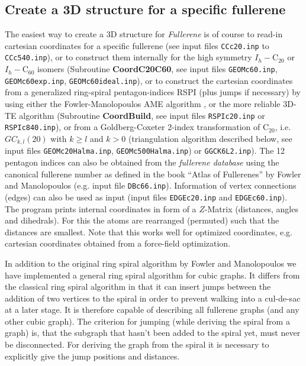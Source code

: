 \documentclass[article,a4paper,twoside]{memoir}
\newcommand{\C}[1]{\ensuremath{\mathrm{C}_{#1}}}
\newcommand{\program}[1]{\textit{#1}}
\newcommand{\filename}[1]{\texttt{#1}}
\newcommand{\funname}[1]{{\color{blue}\textbf{#1}}}
\begin{document}

\subsection{Create a 3D structure for a specific fullerene}

The easiest way to create a 3D structure for \program{Fullerene} is of course to read-in cartesian coordinates for a specific
fullerene (see input files \filename{CCc20.inp} to \filename{CCc540.inp}), or to construct them internally for the high
symmetry $I_h-$\C{20} or $I_h-$\C{60} isomers (Subroutine \funname{CoordC20C60}, see input files \filename{GEOMc60.inp},
\filename{GEOMc60exp.inp}, \filename{GEOMc60ideal.inp}), or to construct the cartesian coordinates from a generalized ring-spiral
pentagon-indices RSPI (plus jumps if necessary) by using either the Fowler-Manolopoulos AME algorithm \cite{Atlas},
or the more reliable 3D-TE algorithm (Subroutine \funname{CoordBuild}, see input files \filename{RSPIc20.inp} or \filename{RSPIc840.inp}),
or from a Goldberg-Coxeter 2-index transformation of \C{20}, i.e. $GC_{k,l}(20)$ with $k \geq l$ and $k > 0$
(triangulation algorithm described below, see input files \filename{GEOMc20Halma.inp}, \filename{GEOMc500Halma.inp}) or \filename{GGCK6L2.inp}). 
The 12 pentagon indices can also be obtained from the \textit{fullerene database} using 
the canonical fullerene number as defined in the book ``Atlas of Fullerenes'' by Fowler and Manolopoulos \cite{Atlas,cvetkovic2002} 
(e.g. input file \filename{DBc66.inp}). Information of vertex connections (edges) can also be used as input 
(input files \filename{EDGEc20.inp} and \filename{EDGEc60.inp}).
The program prints internal coordinates in form of a $Z$-Matrix (distances, angles and dihedrals).
For this the atoms are rearranged (permuted) such that the distances are smallest. Note that this works well for optimized
coordinates, e.g. cartesian coordinates obtained from a force-field optimization.

In addition to the original ring spiral algorithm by Fowler and Manolopoulos we
have implemented a general ring spiral algorithm for cubic graphs.  It
differs from the classical ring spiral algorithm in that it can insert
jumps between the addition of two vertices to the spiral in order to
prevent walking into a cul-de-sac at a later stage.  It is therefore
capable of describing all fullerene graphs (and any other cubic graph).
The criterion for jumping (while deriving the spiral from a graph) is,
that the subgraph that hasn't been added to the spiral yet, must never
be disconnected.  For deriving the graph from the spiral it is necessary
to explicitly give the jump positions and distances. 
\end{document}

